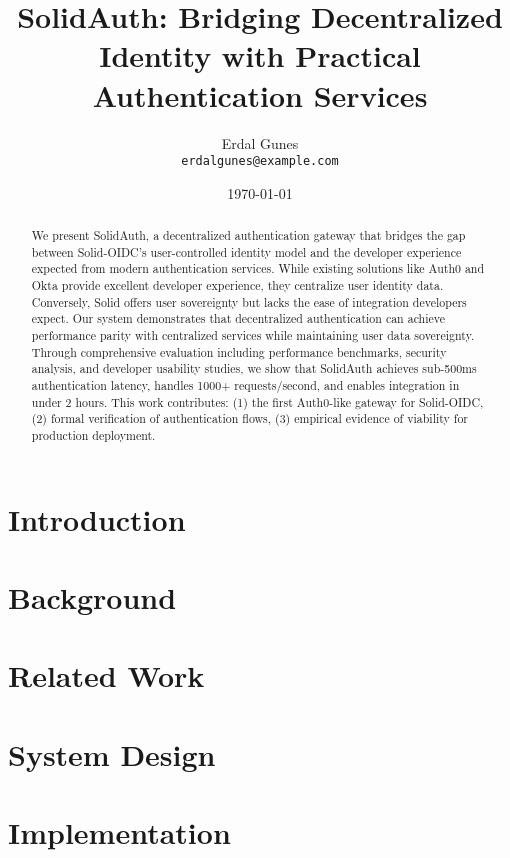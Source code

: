 \documentclass[11pt,a4paper]{article}
\title{SolidAuth: Bridging Decentralized Identity with Practical Authentication Services}
\author{
  Erdal Gunes\\
  \texttt{erdalgunes@example.com}
}
\date{\today}
\begin{document}
\maketitle

\begin{abstract}
We present SolidAuth, a decentralized authentication gateway that bridges the gap between Solid-OIDC's user-controlled identity model and the developer experience expected from modern authentication services. 
While existing solutions like Auth0 and Okta provide excellent developer experience, they centralize user identity data. 
Conversely, Solid offers user sovereignty but lacks the ease of integration developers expect.
Our system demonstrates that decentralized authentication can achieve performance parity with centralized services while maintaining user data sovereignty.
Through comprehensive evaluation including performance benchmarks, security analysis, and developer usability studies, we show that SolidAuth achieves sub-500ms authentication latency, handles 1000+ requests/second, and enables integration in under 2 hours.
This work contributes: (1) the first Auth0-like gateway for Solid-OIDC, (2) formal verification of authentication flows, (3) empirical evidence of viability for production deployment.
\end{abstract}

\section{Introduction}

\section{Background}

\section{Related Work}

\section{System Design}

\section{Implementation}
\end{document}
